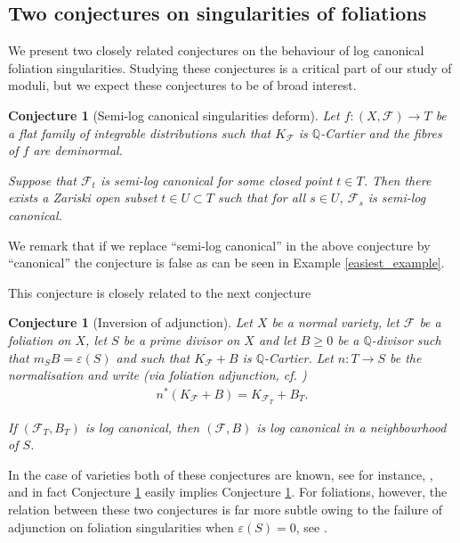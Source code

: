 \documentclass[12pt, a4paper]{amsart}
\newtheorem{conjecture}[theorem]{Conjecture}
\theoremstyle{definition}
\theoremstyle{named}
\begin{document}
\subsection{Two conjectures on singularities of foliations}

We present two closely related conjectures on the behaviour of log canonical
foliation singularities.  Studying these conjectures is a critical part of our 
study of moduli, but we expect these conjectures to be of broad interest.

\begin{conjecture}[Semi-log canonical singularities deform] \label{conjecture sing}
        Let $f\colon (X, \mathcal F) \rightarrow T$ be a flat
    family of integrable distributions such that $K_{\mathcal F}$ is $\mathbb Q$-Cartier and the fibres of $f$ are  deminormal.

 Suppose that $\mathcal F_t$
    is semi-log canonical for some closed point $t \in T$.  Then there exists a Zariski open subset $t \in U \subset T$ such that for all $s \in U$,
    $\mathcal F_{s}$ is semi-log canonical.    
\end{conjecture}


We remark that if we replace ``semi-log canonical'' in the above conjecture by ``canonical'' the conjecture is false as can be seen in Example \ref{easiest_example}.


This conjecture is closely related  to the next conjecture

\begin{conjecture}[Inversion of adjunction]
\label{conj_inversion_adjunction}
Let $X$ be a normal variety, let $\mathcal F$ be a foliation on $X$, let $S$ be a prime divisor on $X$ and let $B \ge 0$
be a $\mathbb Q$-divisor such that $m_SB = \varepsilon(S)$
and such that $K_{\mathcal F}+B$ is $\mathbb Q$-Cartier.
Let $n\colon T \rightarrow S$ be the normalisation and write (via foliation adjunction, cf. \cite[Proposition-Definition 3.7]{CS23b}) \begin{align*}n^*(K_{\mathcal F}+B) = K_{\mathcal F_T}+B_T.\end{align*} 

If $(\mathcal F_T, B_T)$ is log canonical, then 
$(\mathcal F, B)$ is log canonical in a neighbourhood of $S$.
\end{conjecture}

In the case of varieties both of these conjectures are known, see for instance, \cite{Kawakita05}, and in fact 
Conjecture \ref{conj_inversion_adjunction} easily implies Conjecture \ref{conjecture sing}.
For foliations, however, the relation between these two conjectures is far more subtle owing to the failure of adjunction on foliation singularities when $\varepsilon(S) = 0$, see \cite[Example 3.20]{CS23b}.
\end{document}
